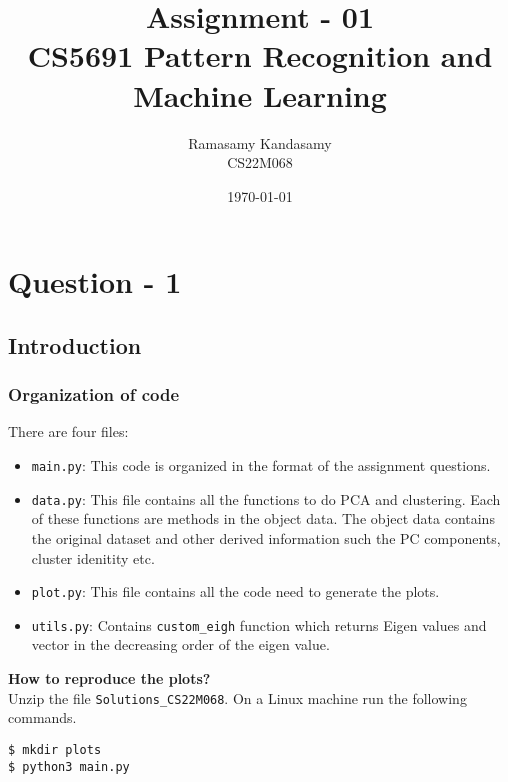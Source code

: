


\title{Assignment - 01\\ CS5691 Pattern Recognition and Machine Learning}
\author{Ramasamy Kandasamy\\ CS22M068}
\date{\today}


\maketitle



\section*{Question - 1}

\subsection*{Introduction}

\subsubsection*{Organization of code}

There are four files:

\begin{itemize}
\item \texttt{main.py}: This code is organized in the format of the assignment questions. 
\item \texttt{data.py}: This file contains all the functions to do PCA and clustering. Each of these functions are methods in the object data. The object data contains  the original dataset and other derived information such the PC components, cluster idenitity etc.
\item \texttt{plot.py}: This file contains all the code need to generate the plots.
\item \texttt{utils.py}: Contains \texttt{custom\_eigh} function which returns Eigen values and vector in the decreasing order of the eigen value.
\end{itemize}

\begin{mdframed}[backgroundcolor=SlateGray2!40,linecolor=Firebrick4]
\textbf{How to reproduce the plots?}\\
Unzip the file \texttt{Solutions\_CS22M068}. On a Linux machine run the following commands.
\begin{verbatim}
$ mkdir plots	
$ python3 main.py
\end{verbatim}
\end{mdframed}

